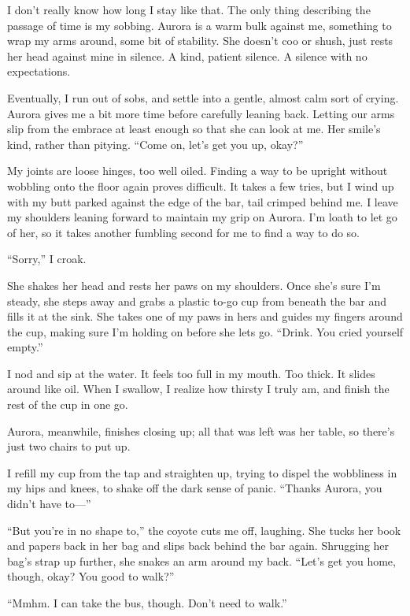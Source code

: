 I don't really know how long I stay like that. The only thing describing the passage of time is my sobbing. Aurora is a warm bulk against me, something to wrap my arms around, some bit of stability. She doesn't coo or shush, just rests her head against mine in silence. A kind, patient silence. A silence with no expectations.

Eventually, I run out of sobs, and settle into a gentle, almost calm sort of crying. Aurora gives me a bit more time before carefully leaning back. Letting our arms slip from the embrace at least enough so that she can look at me. Her smile's kind, rather than pitying. ``Come on, let's get you up, okay?''

My joints are loose hinges, too well oiled. Finding a way to be upright without wobbling onto the floor again proves difficult. It takes a few tries, but I wind up with my butt parked against the edge of the bar, tail crimped behind me. I leave my shoulders leaning forward to maintain my grip on Aurora. I'm loath to let go of her, so it takes another fumbling second for me to find a way to do so.

``Sorry,'' I croak.

She shakes her head and rests her paws on my shoulders. Once she's sure I'm steady, she steps away and grabs a plastic to-go cup from beneath the bar and fills it at the sink. She takes one of my paws in hers and guides my fingers around the cup, making sure I'm holding on before she lets go. ``Drink. You cried yourself empty.''

I nod and sip at the water. It feels too full in my mouth. Too thick. It slides around like oil. When I swallow, I realize how thirsty I truly am, and finish the rest of the cup in one go.

Aurora, meanwhile, finishes closing up; all that was left was her table, so there's just two chairs to put up.

I refill my cup from the tap and straighten up, trying to dispel the wobbliness in my hips and knees, to shake off the dark sense of panic. ``Thanks Aurora, you didn't have to---''

``But you're in no shape to,'' the coyote cuts me off, laughing. She tucks her book and papers back in her bag and slips back behind the bar again. Shrugging her bag's strap up further, she snakes an arm around my back. ``Let's get you home, though, okay? You good to walk?''

``Mmhm. I can take the bus, though. Don't need to walk.''

